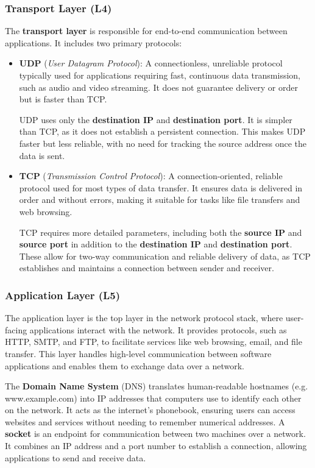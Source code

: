 \subsubsection{Transport Layer (L4)} \label{layer4}

The \textbf{transport layer} is responsible for end-to-end communication between applications. It includes two primary protocols:

\begin{itemize}
    \item \textbf{UDP} (\textit{User Datagram Protocol}): A connectionless, unreliable protocol typically used for applications requiring fast, continuous data transmission, such as audio and video streaming. It does not guarantee delivery or order but is faster than TCP.

    UDP uses only the \textbf{destination IP} and \textbf{destination port}. It is simpler than TCP, as it does not establish a persistent connection. This makes UDP faster but less reliable, with no need for tracking the source address once the data is sent.

    \item \textbf{TCP} (\textit{Transmission Control Protocol}): A connection-oriented, reliable protocol used for most types of data transfer. It ensures data is delivered in order and without errors, making it suitable for tasks like file transfers and web browsing.

    TCP requires more detailed parameters, including both the \textbf{source IP} and \textbf{source port} in addition to the \textbf{destination IP} and \textbf{destination port}. These allow for two-way communication and reliable delivery of data, as TCP establishes and maintains a connection between sender and receiver.
\end{itemize}

\subsubsection{Application Layer (L5)} \label{layer5}

The application layer is the top layer in the network protocol stack, where user-facing applications interact with the network. It provides protocols, such as HTTP, SMTP, and FTP, to facilitate services like web browsing, email, and file transfer. This layer handles high-level communication between software applications and enables them to exchange data over a network.

The \textbf{Domain Name System} (DNS) translates human-readable hostnames (e.g. www.example.com) into IP addresses that computers use to identify each other on the network. It acts as the internet's phonebook, ensuring users can access websites and services without needing to remember numerical addresses. A \textbf{socket} is an endpoint for communication between two machines over a network. It combines an IP address and a port number to establish a connection, allowing applications to send and receive data.

